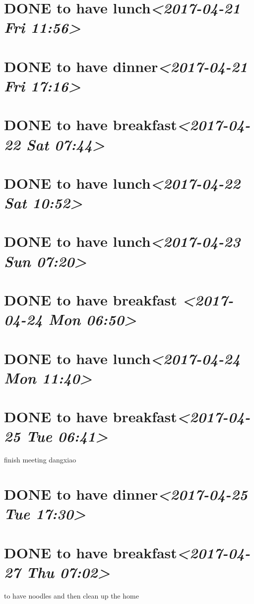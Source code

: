 \documentclass[cyan]{elegantnote}
\begin{document}
\section{{\bfseries\sffamily DONE} to have lunch\textit{<2017-04-21 Fri 11:56>}}
\label{sec:org3605276}
\section{{\bfseries\sffamily DONE} to have dinner\textit{<2017-04-21 Fri 17:16>}}
\label{sec:org12b9074}
\section{{\bfseries\sffamily DONE} to have breakfast\textit{<2017-04-22 Sat 07:44>}}
\label{sec:orge44a7a1}
\section{{\bfseries\sffamily DONE} to have lunch\textit{<2017-04-22 Sat 10:52>}}
\label{sec:org89d973e}
\section{{\bfseries\sffamily DONE} to have lunch\textit{<2017-04-23 Sun 07:20>}}
\label{sec:org234e4ab}
\section{{\bfseries\sffamily DONE} to have breakfast \textit{<2017-04-24 Mon 06:50>}}
\label{sec:org14379bc}
\section{{\bfseries\sffamily DONE} to have lunch\textit{<2017-04-24 Mon 11:40>}}
\label{sec:org939097d}
\section{{\bfseries\sffamily DONE} to have breakfast\textit{<2017-04-25 Tue 06:41>}}
\label{sec:org86b7835}
finish meeting dangxiao
\section{{\bfseries\sffamily DONE} to have dinner\textit{<2017-04-25 Tue 17:30>}}
\label{sec:orgb710fd2}
\section{{\bfseries\sffamily DONE} to have breakfast\textit{<2017-04-27 Thu 07:02>}}
\label{sec:org9953cdb}
to have noodles and then clean up the home
\end{document}
